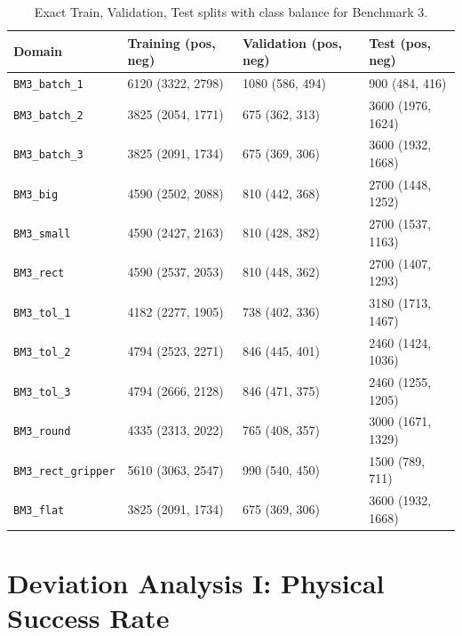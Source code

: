 \begin{table}[htbp]
    \centering
    \caption{Exact Train, Validation, Test splits with class balance for Benchmark 3.}
    \label{tab:bm3_data_split}
    \begin{tabular}{llll}
        \toprule
        \textbf{Domain} & \textbf{Training (pos, neg)} & \textbf{Validation (pos, neg)} & \textbf{Test (pos, neg)}\\
        \midrule

        \texttt{BM3\_batch\_1} & 6120 (3322, 2798) & 1080 (586, 494) & 900 (484, 416) \\
        \texttt{BM3\_batch\_2} & 3825 (2054, 1771) & 675 (362, 313) & 3600 (1976, 1624) \\
        \texttt{BM3\_batch\_3} & 3825 (2091, 1734) & 675 (369, 306) & 3600 (1932, 1668) \\

        \texttt{BM3\_big} & 4590 (2502, 2088) & 810 (442, 368) & 2700 (1448, 1252) \\
        \texttt{BM3\_small} & 4590 (2427, 2163) & 810 (428, 382) & 2700 (1537, 1163) \\
        \texttt{BM3\_rect} & 4590 (2537, 2053) & 810 (448, 362) & 2700 (1407, 1293) \\

        \texttt{BM3\_tol\_1} & 4182 (2277, 1905) & 738 (402, 336) & 3180 (1713, 1467) \\
        \texttt{BM3\_tol\_2} & 4794 (2523, 2271) & 846 (445, 401) & 2460 (1424, 1036) \\
        \texttt{BM3\_tol\_3} & 4794 (2666, 2128) & 846 (471, 375) & 2460 (1255, 1205) \\

        \texttt{BM3\_round} & 4335 (2313, 2022) & 765 (408, 357) & 3000 (1671, 1329) \\
        \texttt{BM3\_rect\_gripper} & 5610 (3063, 2547) & 990 (540, 450) & 1500 (789, 711) \\
        \texttt{BM3\_flat} & 3825 (2091, 1734) & 675 (369, 306) & 3600 (1932, 1668) \\
        \bottomrule
    \end{tabular}
\end{table}

\newpage
\section{Deviation Analysis I: Physical Success Rate}
\label{subsec:results_deviation_analysis_1}

